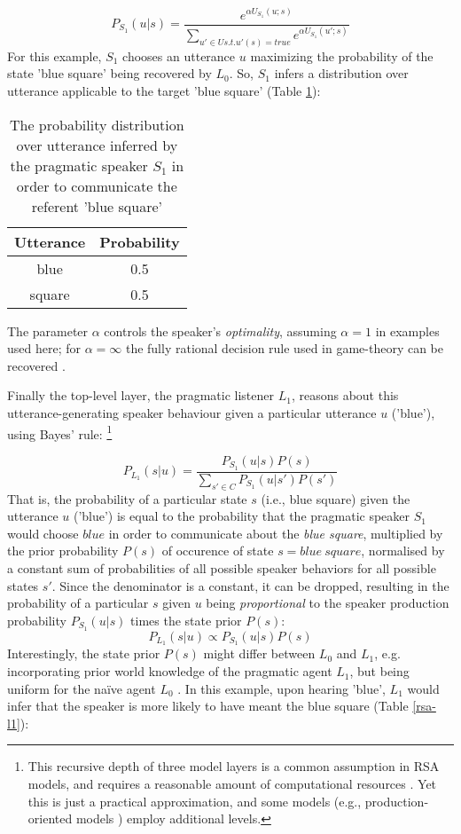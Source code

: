 $$P_{S_1}(u | s) = \frac{e^{\alpha U_{S_1} (u; s)}}{\sum_{u' \in U s.t. u'(s) = true} e^{\alpha U_{S_1} (u'; s)}}$$
For this example, $S_1$ chooses an utterance $u$ maximizing the probability of the state 'blue square' being recovered by $L_0$. So, $S_1$ infers a distribution over utterance applicable to the target 'blue square' (Table \ref{rsa-s1}):

\begin{table}[h]
	\begin{center}
		\caption{The probability distribution over utterance inferred by the pragmatic speaker $S_1$ in order to communicate the referent 'blue square'}
		\label{rsa-s1}
		\vskip 0.12in
		\begin{tabular}{cc}
			Utterance & Probability \\
			\hline
			blue & 0.5 \\
			square & 0.5
		\end{tabular}
	\end{center}
\end{table}
The parameter $\alpha$ controls the speaker's \emph{optimality}, assuming $\alpha = 1$ in examples used here; for $\alpha = \infty $ the fully rational decision rule used in game-theory can be recovered \parencite{problang, lassiter2017adjectival}.
 
Finally the top-level layer, the pragmatic listener $L_1$, reasons about this utterance-generating speaker behaviour given a particular utterance $u$ ('blue'), using Bayes' rule: \footnote{This recursive depth of three model layers is a common assumption in RSA models, and requires a reasonable amount of computational resources \parencite{lassiter2017adjectival}. Yet this is just a practical approximation, and some models (e.g., production-oriented models ) employ additional levels\parencite{problang}.}
 
$$P_{L_1}(s | u) = \frac{P_{S_1}(u | s) P(s)}{\sum_{s' \in C} P_{S_1}(u | s') P(s')}$$
That is, the probability of a particular state $s$ (i.e., blue square) given the utterance $u$ ('blue') is equal to the probability that the pragmatic speaker $S_1$ would choose $blue$ in order to communicate about the \textit{blue square}, multiplied by the prior probability $P(s)$ of occurence of state $s = blue \:square$, normalised by a constant sum of probabilities of all possible speaker behaviors for all possible states $s'$. Since the denominator is a constant, it can be dropped, resulting in the probability of a particular $s$ given $u$ being \emph{proportional} to the speaker production probability $P_{S_1}(u | s)$ times the state prior $P(s)$:
$$P_{L_1}(s | u) \propto P_{S_1}(u | s) P(s)$$ 
Interestingly, the state prior $P(s)$ might differ between $L_0$ and $L_1$, e.g. incorporating prior world knowledge of the pragmatic agent $L_1$, but being uniform for the na\"ive agent $L_0$ \parencite{problang}. In this example, upon hearing 'blue', $L_1$ would infer that the speaker is more likely to have meant the blue square (Table \ref{rsa-l1}):

